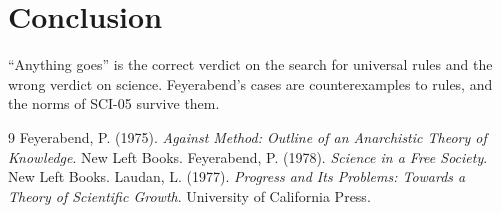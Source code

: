 \documentclass{situationist-preprint}
\begin{document}
\section{Conclusion}\label{s:conclusion}

\enquote{Anything goes} is the correct verdict on the search for universal rules and the wrong verdict on science. Feyerabend's cases are counterexamples to rules, and the norms of SCI-05 survive them.

\begin{thebibliography}{9}
 Feyerabend, P. (1975). \emph{Against Method: Outline of an Anarchistic Theory of Knowledge}. New Left Books.
 Feyerabend, P. (1978). \emph{Science in a Free Society}. New Left Books.
 Laudan, L. (1977). \emph{Progress and Its Problems: Towards a Theory of Scientific Growth}. University of California Press.
\end{thebibliography}
\end{document}
